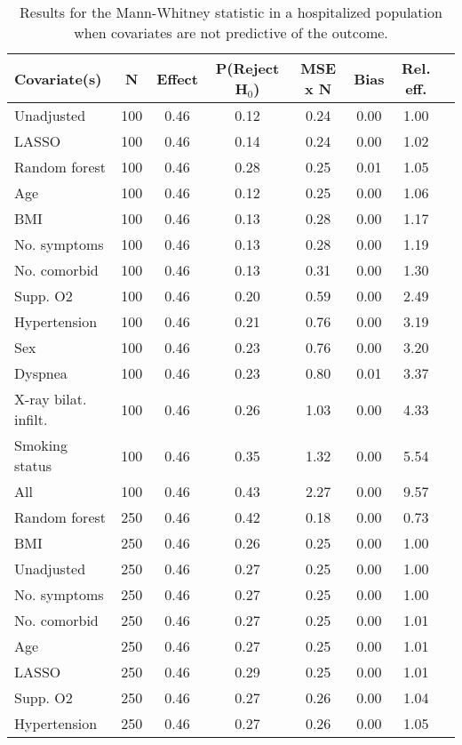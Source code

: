 \documentclass{article}
\begin{document}
\clearpage

{\tabcolsep=6pt  %
\begin{longtable}{lccccccc}
\caption{Results for the Mann-Whitney statistic in a hospitalized population when covariates are not predictive of the outcome.} \\
Covariate(s) & N & Effect & P(Reject H$_0$) & MSE x N & Bias & Rel. eff.\\ \midrule
Unadjusted & 100 & 0.46 & 0.12 & 0.24 & 0.00 & 1.00 \\ 
LASSO & 100 & 0.46 & 0.14 & 0.24 & 0.00 & 1.02 \\ 
Random forest & 100 & 0.46 & 0.28 & 0.25 & 0.01 & 1.05 \\ 
Age & 100 & 0.46 & 0.12 & 0.25 & 0.00 & 1.06 \\ 
BMI & 100 & 0.46 & 0.13 & 0.28 & 0.00 & 1.17 \\ 
No. symptoms & 100 & 0.46 & 0.13 & 0.28 & 0.00 & 1.19 \\ 
No. comorbid & 100 & 0.46 & 0.13 & 0.31 & 0.00 & 1.30 \\ 
Supp. O2 & 100 & 0.46 & 0.20 & 0.59 & 0.00 & 2.49 \\ 
Hypertension & 100 & 0.46 & 0.21 & 0.76 & 0.00 & 3.19 \\ 
Sex & 100 & 0.46 & 0.23 & 0.76 & 0.00 & 3.20 \\ 
Dyspnea & 100 & 0.46 & 0.23 & 0.80 & 0.01 & 3.37 \\ 
X-ray bilat. infilt. & 100 & 0.46 & 0.26 & 1.03 & 0.00 & 4.33 \\ 
Smoking status & 100 & 0.46 & 0.35 & 1.32 & 0.00 & 5.54 \\ 
All & 100 & 0.46 & 0.43 & 2.27 & 0.00 & 9.57 \\ \midrule() 
Random forest & 250 & 0.46 & 0.42 & 0.18 & 0.00 & 0.73 \\ 
BMI & 250 & 0.46 & 0.26 & 0.25 & 0.00 & 1.00 \\ 
Unadjusted & 250 & 0.46 & 0.27 & 0.25 & 0.00 & 1.00 \\ 
No. symptoms & 250 & 0.46 & 0.27 & 0.25 & 0.00 & 1.00 \\ 
No. comorbid & 250 & 0.46 & 0.27 & 0.25 & 0.00 & 1.01 \\ 
Age & 250 & 0.46 & 0.27 & 0.25 & 0.00 & 1.01 \\ 
LASSO & 250 & 0.46 & 0.29 & 0.25 & 0.00 & 1.01 \\ 
Supp. O2 & 250 & 0.46 & 0.27 & 0.26 & 0.00 & 1.04 \\ 
Hypertension & 250 & 0.46 & 0.27 & 0.26 & 0.00 & 1.05 \\ 

\end{longtable}}
\end{document}
